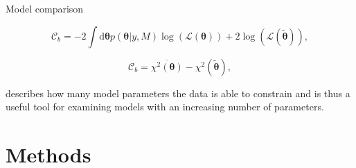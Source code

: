 \documentclass[11pt,aspectratio=1610,dvipsnames]{beamer}
\begin{document}
\begin{frame}{Model comparison}

	\begin{tcolorbox}[colback=black!5,colframe=gray!15!black,title=\textsc{Bayesian} complexity] 
		\begin{equation}\label{eq:Bayes_Complexity}
			\mathcal{C}_b=-2\int \text{d}\boldsymbol{\theta} p(\boldsymbol{\theta}|y,M)\log(\mathcal{L}(\boldsymbol{\theta}))+2\log(\mathcal{L}(\boldsymbol{\tilde{\theta}})),
		\end{equation}
	
		\begin{equation}\label{eq:Bayes_Complexity_alt}
		\mathcal{C}_b=\overline{\chi^2(\boldsymbol{\theta})}-\chi^2(\boldsymbol{\tilde{\theta}}),
	\end{equation}
	\end{tcolorbox}

describes how many model parameters the data is able to constrain \citet{kunz} and is thus a useful tool for examining models with an increasing number of parameters.
\end{frame}

\section{Methods}
\end{document}
